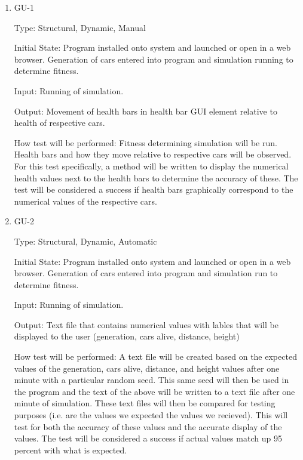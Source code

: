 \documentclass[12pt, titlepage]{article}
\begin{document}
\begin{enumerate}

\item{GU-1\\}

Type: Structural, Dynamic, Manual
					
Initial State: Program installed onto system and launched or open in a web browser. Generation of cars entered into program and simulation running to determine fitness.
					
Input: Running of simulation.
					
Output: Movement of health bars in health bar GUI element relative to health of respective cars.
					
How test will be performed: Fitness determining simulation will be run. Health bars and how they move relative to respective cars will be observed. For this test specifically, a method will be written to display the numerical health values next to the health bars to determine the accuracy of these. The test will be considered a success if health bars graphically correspond to the numerical values of the respective cars. 
					
\item{GU-2\\}

Type: Structural, Dynamic, Automatic
					
Initial State: Program installed onto system and launched or open in a web browser. Generation of cars entered into program and simulation run to determine fitness.
					
Input: Running of simulation.
					
Output: Text file that contains numerical values with lables that will be displayed to the user (generation, cars alive, distance, height)
					
How test will be performed: A text file will be created based on the expected values of the generation, cars alive, distance, and height values after one minute with a particular random seed. This same seed will then be used in the program and the text of the above will be written to a text file after one minute of simulation. These text files will then be compared for testing purposes (i.e. are the values we expected the values we recieved). This will test for both the accuracy of these values and the accurate display of the values. The test will be considered a success if actual values match up 95 percent with what is expected.

\end{enumerate}
\end{document}
